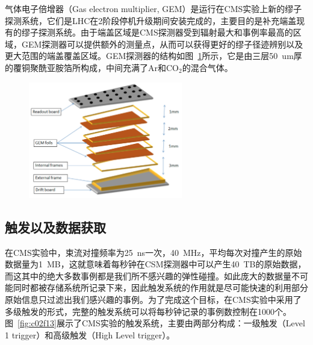 气体电子倍增器（Gas electron multiplier, GEM）是运行在CMS实验上新的缪子探测系统，它们是LHC在2阶段停机升级期间安装完成的，主要目的是补充端盖现有的缪子探测系统。由于端盖区域是CMS探测器受到辐射最大和事例率最高的区域，GEM探测器可以提供额外的测量点，从而可以获得更好的缪子径迹辨别以及更大范围的端盖覆盖区域。GEM探测器的结构如图~\ref{fig:c02f12}所示，它是由三层50~\si{um}厚的覆铜聚酰亚胺箔所构成，中间充满了Ar和CO$_2$的混合气体。

\begin{figure}[!htbp]
    \centering
    \includegraphics[width=0.6\textwidth]{figures/chapter02/GEM.jpg}
    \label{fig:c02f12}
\end{figure}

\subsection{触发以及数据获取}

在CMS实验中，束流对撞频率为25~\si{ns}一次，40~\si{MHz}，平均每次对撞产生的原始数据量为1~MB，这就意味着每秒钟在CSM探测器中可以产生40~\si{TB}的原始数据，而这其中的绝大多数事例都是我们所不感兴趣的弹性碰撞。如此庞大的数据量不可能同时都被存储系统所记录下来，因此触发系统的作用就是尽可能快速的利用部分原始信息只过滤出我们感兴趣的事例。为了完成这个目标，在CMS实验中采用了多级触发的形式，完整的触发系统可以将每秒钟记录的事例数控制在1000个。图~\ref{fig:c02f13}展示了CMS实验的触发系统，主要由两部分构成：一级触发（Level 1 trigger）和高级触发（High Level trigger）。

